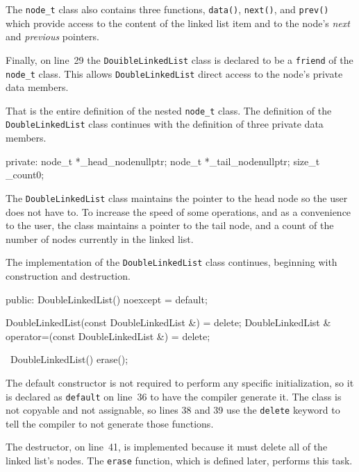 \documentclass{article}
\begin{document}
  The \verb|node_t| class also contains three functions, \verb|data()|, \verb|next()|, and \verb|prev()| which provide access to the content of the linked list item and to the node's \emph{next} and \emph{previous} pointers.
  \begin{lstcpp}
    T &data() noexcept {
        return _data;
    }

    node_t *next() const noexcept {
        return _next;
    }

    node_t *prev() const noexcept {
        return _prev;
    }

    friend DoubleLinkedList;
  };\end{lstcpp}
  Finally, on line~29 the \verb|DouibleLinkedList| class is declared to be a \verb|friend| of the \verb|node_t| class. This allows \verb|DoubleLinkedList| direct access to the node's private data members.

  That is the entire definition of the nested \verb|node_t| class. The definition of the \verb|DoubleLinkedList| class continues with the definition of three private data members.
  \begin{lstcpp}
private:
  node_t *_head_node{nullptr};
  node_t *_tail_node{nullptr};
  size_t  _count{0};\end{lstcpp}
  The \verb|DoubleLinkedList| class maintains the pointer to the head node so the user does not have to. To increase the speed of some operations, and as a convenience to the user, the class maintains a pointer to the tail node, and a count of the number of nodes currently in the linked list.

  The implementation of the \verb|DoubleLinkedList| class continues, beginning with construction and destruction.
  \begin{lstcpp}
public:
  DoubleLinkedList() noexcept = default;

  DoubleLinkedList(const DoubleLinkedList &) = delete;
  DoubleLinkedList & operator=(const DoubleLinkedList &) = delete;

  ~DoubleLinkedList() {
    erase();
  }\end{lstcpp}
  The default constructor is not required to perform any specific initialization, so it is declared as \verb|default| on line~36 to have the compiler generate it. The class is not copyable and not assignable, so lines 38 and 39 use the \verb|delete| keyword to tell the compiler to not generate those functions.

  The destructor, on line~41,  is implemented because it must delete all of the linked list's nodes. The \verb|erase| function, which is defined later, performs this task.
\end{document}
